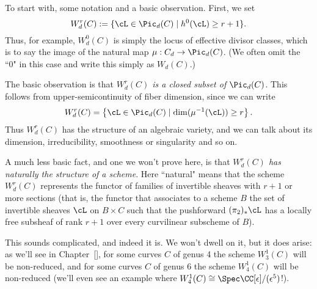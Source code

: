 To start with, some notation and a basic observation. First, we set
$$
W^r_d(C) := \{ \cL \in \Pic_d(C) \mid h^0(\cL) \geq r+1 \}.
$$
Thus, for example, $W^0_d(C)$ is simply the locus of effective divisor classes, which is to say the image of the natural map $\mu : C_d \to \Pic_d(C)$. (We often omit the ``0" in this case and write this simply as $W_d(C)$.)

The basic observation is that \emph{$W^r_d(C)$ is a closed subset of $\Pic_d(C)$}. This follows from upper-semicontinuity of fiber dimension, since we can write
$$
W^r_d(C) = \left\{ \cL \in \Pic_d(C) \mid \dim(\mu^{-1}(\cL)) \geq r \right\}.
$$
Thus $W^r_d(C)$ has the structure of an algebraic variety, and we can talk about its dimension, irreducibility, smoothness or singularity and so on.

A much less basic fact, and one we won't prove here, is that \emph{$W^r_d(C)$ has naturally the structure of a scheme}. Here ``natural" means that the scheme $W^r_d(C)$ represents the functor of families of invertible sheaves with $r+1$ or more sections (that is, the functor that associates to a scheme $B$ the set of invertible sheaves $\cL$ on $B \times C$ such that the pushforward $(\pi_2)_*\cL$ has a locally free subsheaf of rank $r+1$ over every curvilinear subscheme of $B$). 

This sounds complicated, and indeed it is. We won't  dwell on it, but it does arise: as we'll see in Chapter~\ref{}, for some curves $C$ of genus 4 the scheme $W^1_3(C)$ will be non-reduced, and for some curves $C$ of genus 6 the scheme $W^1_4(C)$ will be non-reduced (we'll even see an example where $W^1_4(C) \cong \Spec \CC[\epsilon]/(\epsilon^5)$!). 

%
%


